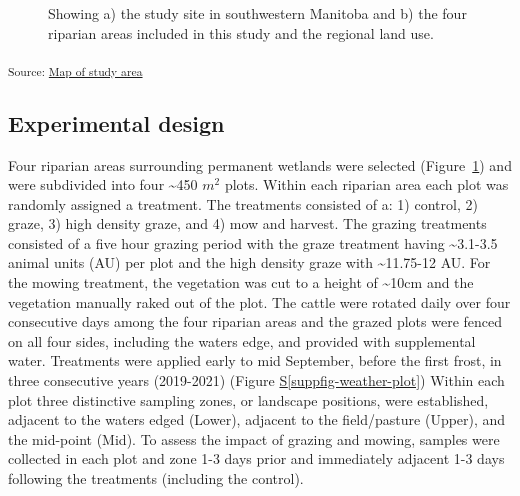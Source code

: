 \documentclass[
]{agujournal2019}
\newcommand*\quartosuppfigref[1]{Figure \hyperref[#1]{S\ref{#1}}}
\begin{document}
\begin{figure}[H]


\caption{\label{fig-map}Showing a) the study site in southwestern
Manitoba and b) the four riparian areas included in this study and the
regional land use.}

\end{figure}%

\textsubscript{Source:
\href{https://alex-koiter.github.io/riparian-grazing-manuscript/notebooks/05_Map-preview.html\#cell-fig-map}{Map
of study area}}

\subsection{Experimental design}\label{experimental-design}

Four riparian areas surrounding permanent wetlands were selected
(Figure~\ref{fig-map}) and were subdivided into four \textasciitilde450
\(m^2\) plots. Within each riparian area each plot was randomly assigned
a treatment. The treatments consisted of a: 1) control, 2) graze, 3)
high density graze, and 4) mow and harvest. The grazing treatments
consisted of a five hour grazing period with the graze treatment having
\textasciitilde3.1-3.5 animal units (AU) per plot and the high density
graze with \textasciitilde11.75-12 AU. For the mowing treatment, the
vegetation was cut to a height of \textasciitilde10cm and the vegetation
manually raked out of the plot. The cattle were rotated daily over four
consecutive days among the four riparian areas and the grazed plots were
fenced on all four sides, including the waters edge, and provided with
supplemental water. Treatments were applied early to mid September,
before the first frost, in three consecutive years (2019-2021)
(\quartosuppfigref{suppfig-weather-plot}) Within each plot three
distinctive sampling zones, or landscape positions, were established,
adjacent to the waters edged (Lower), adjacent to the field/pasture
(Upper), and the mid-point (Mid). To assess the impact of grazing and
mowing, samples were collected in each plot and zone 1-3 days prior and
immediately adjacent 1-3 days following the treatments (including the
control).
\end{document}
